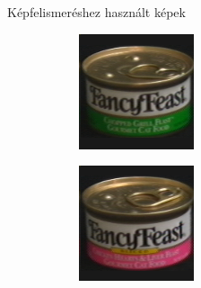 \documentclass{beamer}
\begin{document}
\begin{frame}{Képfelismeréshez használt képek}
\begin{figure}
\begin{subfigure}{55pt}
        \end{subfigure}
        \begin{subfigure}{55pt}
            \centering
        \includegraphics[width=\textwidth]{figures/coil_original/29.png}

        \end{subfigure}
    \end{figure}
    \vskip -5mm
    \begin{figure}
        \begin{subfigure}{55pt}
            \centering
        \includegraphics[width=\textwidth]{figures/coil_original/32.png}
        

\end{subfigure}
\end{figure}
\end{frame}
\end{document}
